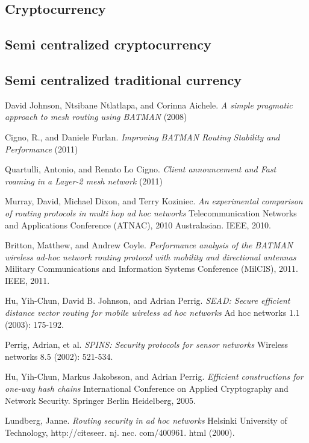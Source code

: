 \documentclass[11pt]{article}
\begin{document}
    \subsection{Cryptocurrency}
    \subsection{Semi centralized cryptocurrency}
    \subsection{Semi centralized traditional currency}

\medskip


\begin{thebibliography}{1}



David Johnson, Ntsibane Ntlatlapa, and Corinna Aichele.
\textit{A simple pragmatic approach to mesh routing using BATMAN} (2008)

Cigno, R., and Daniele Furlan.
\textit{Improving BATMAN Routing Stability and Performance} (2011)

Quartulli, Antonio, and Renato Lo Cigno.
\textit{Client announcement and Fast roaming in a Layer-2 mesh network} (2011)

Murray, David, Michael Dixon, and Terry Koziniec.
\textit{An experimental comparison of routing protocols in multi hop ad hoc networks} Telecommunication Networks and Applications Conference (ATNAC), 2010 Australasian. IEEE, 2010.

Britton, Matthew, and Andrew Coyle.
\textit{Performance analysis of the BATMAN wireless ad-hoc network routing protocol with mobility and directional antennas} Military Communications and Information Systems Conference (MilCIS), 2011. IEEE, 2011.

Hu, Yih-Chun, David B. Johnson, and Adrian Perrig. 
\textit{SEAD: Secure efficient distance vector routing for mobile wireless ad hoc networks} Ad hoc networks 1.1 (2003): 175-192.

Perrig, Adrian, et al. 
\textit{SPINS: Security protocols for sensor networks} Wireless networks 8.5 (2002): 521-534.

Hu, Yih-Chun, Markus Jakobsson, and Adrian Perrig. 
\textit{Efficient constructions for one-way hash chains} International Conference on Applied Cryptography and Network Security. Springer Berlin Heidelberg, 2005.

Lundberg, Janne. 
\textit{Routing security in ad hoc networks} Helsinki University of Technology, http://citeseer. nj. nec. com/400961. html (2000).

\end{thebibliography}

{}

\end{document}
